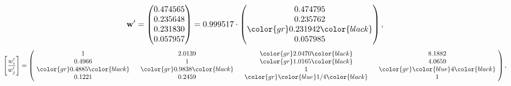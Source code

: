 \begin{example}
\begin{equation*}
\mathbf{w}^{\prime} =
\begin{pmatrix}
0.474565\\
0.235648\\
0.231830\\
0.057957
\end{pmatrix} =
0.999517\cdot
\begin{pmatrix}
0.474795\\
0.235762\\
\color{gr} 0.231942\color{black} \\
0.057985
\end{pmatrix},
\end{equation*}
\begin{equation*}
\left[ \frac{{w}^{\prime}_i}{{w}^{\prime}_j} \right] =
\begin{pmatrix}
$\,\,$ 1 $\,\,$ & $\,\,$2.0139$\,\,$ & $\,\,$\color{gr} 2.0470\color{black} $\,\,$ & $\,\,$8.1882$\,\,$ \\
$\,\,$0.4966$\,\,$ & $\,\,$ 1 $\,\,$ & $\,\,$\color{gr} 1.0165\color{black} $\,\,$ & $\,\,$4.0659  $\,\,$ \\
$\,\,$\color{gr} 0.4885\color{black} $\,\,$ & $\,\,$\color{gr} 0.9838\color{black} $\,\,$ & $\,\,$ 1 $\,\,$ & $\,\,$\color{gr} \color{blue} 4\color{black}  $\,\,$ \\
$\,\,$0.1221$\,\,$ & $\,\,$0.2459$\,\,$ & $\,\,$\color{gr} \color{blue}  1/4\color{black} $\,\,$ & $\,\,$ 1  $\,\,$ \\
\end{pmatrix},
\end{equation*}
\end{example}
\newpage
